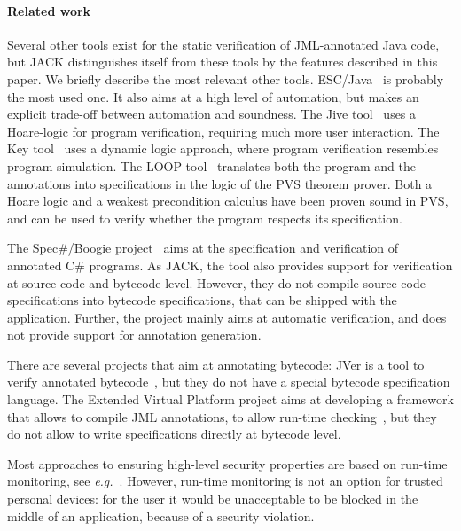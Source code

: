 
\paragraph{Related work}
Several other tools exist for the static verification of JML-annotated
Java code, but JACK distinguishes itself from these tools by the
features described in this paper. We briefly describe the most
relevant other tools. ESC/Java~\cite{CokKiniry04} is probably the most
used one. It also aims at a high level of automation, but makes an
explicit trade-off between automation and soundness. The Jive
tool~\cite{MeyerP00} uses a Hoare-logic for program verification,
requiring much more user interaction. The Key tool~\cite{BeckertHS07}
uses a dynamic logic approach, where program verification resembles
program simulation. The LOOP tool~\cite{BergJ01} translates both the
program and the annotations into specifications in the logic of the
PVS theorem prover. Both a Hoare logic and a weakest precondition
calculus have been proven sound in PVS, and can be used to verify
whether the program respects its specification.

The Spec\#/Boogie project~\cite{SpecSharp04} aims at the specification
and verification of annotated C\# programs. As JACK, the tool also
provides support for verification at source code and bytecode
level. However, they do not compile source code specifications into
bytecode specifications, that can be shipped with the
application. Further, the project mainly aims at automatic
verification, and does not provide support for annotation generation.

There are several projects that aim at annotating bytecode: JVer is a
tool to verify annotated bytecode~\cite{ChanderEILN05}, but they do
not have a special bytecode specification language.  The Extended
Virtual Platform project aims at developing a framework that allows to
compile JML annotations, to allow run-time
checking~\cite{AlagicXVP05}, but they do not allow to write
specifications directly at bytecode level.

Most approaches to ensuring high-level security properties are based
on run-time monitoring, see
\emph{e.g.}~\/\cite{bartetzko01assertions,Schneider99,Erlingsson03,CF00:popl}. However,
run-time monitoring is not an option for trusted personal devices: for
the user it would be unacceptable to be blocked in the middle of an
application, because of a security violation.


